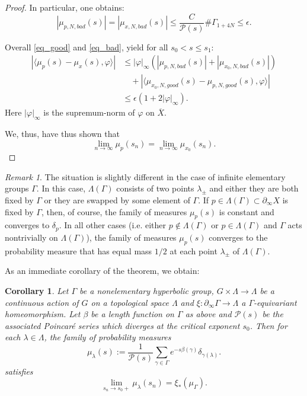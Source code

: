 \documentclass[12pt]{amsbook}%
\newtheorem{cor}[thm]{Corollary}
\theoremstyle{definition}
\theoremstyle{remark}
\newtheorem{rem}[thm]{Remark}
\numberwithin{section}{chapter}
\numberwithin{subsection}{section}
\numberwithin{figure}{chapter}
\def\cP{{\mathscr{P}}}
\def\Ga{\Gamma}
\def\La{\Lambda}
\def\la{\lambda}
\def\geo{\partial_\infty}
\def\ol{\overline}
\begin{document}
{{\begin{proof}
In particular, one obtains: 
\begin{equation}
\label{eq_bad}
|\mu_{p, N , bad}(s)| = |\mu_{x, N , bad}(s)| \leqslant \dfrac{C}{\cP(s)} \# \Gamma_{1+4N} \leqslant \epsilon. 
\end{equation}

Overall \eqref{eq_good} and \eqref{eq_bad}, yield for all $s_0< s \leqslant s_1$: 
\begin{align*}
| \langle \mu_{p}(s) - \mu_{x}(s) , \varphi \rangle |& \leqslant  |\varphi|_\infty (  |\mu_{p, N,bad}(s)| + |\mu_{x_0,N,bad}(s)|  )  \\
& \quad + | \langle \mu_{x_0, N , good}(s) - \mu_{p, N , good}(s) , \varphi \rangle | \\
& \leqslant \epsilon \left ( 1 + 2 |\varphi|_\infty   \right ).  
\end{align*}
Here $|\varphi|_\infty$ is the supremum-norm of $\varphi$ on $\ol{X}$. 

We, thus, have thus shown that 
$$
\lim_{n\rightarrow \infty}\mu_{p}(s_n)=\lim_{n\rightarrow \infty} \mu_{x_0}(s_n).
$$
\end{proof}  
 

 
 \begin{rem}
 The situation is slightly different in the case of infinite elementary groups $\Ga$. In this case, $\La(\Ga)$ consists of two points $\la_\pm$ and either they are both fixed by $\Ga$ or they are swapped by some element  of $\Ga$. If $p\in \La(\Ga)\subset \geo X$ is fixed by $\Ga$, then, of course, the family of measures $\mu_{p}(s)$ is constant and converges to $\delta_p$. In all other cases (i.e. either 
 $p\notin \La(\Ga)$ or 
 $p\in \La(\Ga)$ and $\Ga$ acts nontrivially on $\La(\Ga)$), the family of measures $\mu_{p}(s)$   converges to the probability measure that has equal mass $1/2$ at each point $\la_\pm$ of $\La(\Ga)$. 
 \end{rem}
 

 
 As an immediate corollary of the theorem, we obtain:
 
 
 \begin{cor}\label{cor:Gibbs}
 Let $\Ga$ be a nonelementary hyperbolic group, $G\times\La\to \La$ be a continuous action of $G$ on a topological space $\La$ and $\xi: \geo \Ga\to \La$ a $\Ga$-equivariant homeomorphism. Let $\beta$ be a length function on $\Ga$ as above and $\cP(s)$ be the associated Poincar\'e series which diverges at the critical exponent $s_0$. 
 Then for each $\la\in \La$, the family of probability measures 
 $$
 \mu_\la(s):=  \frac{1}{\cP(s)}\sum_{\gamma\in \Gamma}e^{-s\beta(\gamma)}\delta_{\gamma(\la)}.
 $$ 
satisfies 
 $$
  \lim_{s_n\to s_0+} \mu_\la(s_n)= \xi_*(\mu_{\Ga}).  
 $$
 \end{cor}
 
}}
\end{document}
